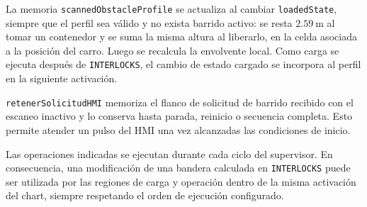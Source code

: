 \documentclass[a4paper,10pt,onecolumn,journal]{ieeeconf}
\numberwithin{equation}{section}
\begin{document}
La memoria \texttt{scannedObstacleProfile} se actualiza al cambiar \texttt{loadedState}, siempre que el perfil sea válido y no exista barrido activo: se resta $2.59~\mathrm{m}$ al tomar un contenedor y se suma la misma altura al liberarlo, en la celda asociada a la posición del carro. Luego se recalcula la envolvente local. Como carga se ejecuta después de \texttt{INTERLOCKS}, el cambio de estado cargado se incorpora al perfil en la siguiente activación.

\texttt{retenerSolicitudHMI} memoriza el flanco de solicitud de barrido recibido con el escaneo inactivo y lo conserva hasta parada, reinicio o secuencia completa. Esto permite atender un pulso del HMI una vez alcanzadas las condiciones de inicio.

Las operaciones indicadas se ejecutan durante cada ciclo del supervisor. En consecuencia, una modificación de una bandera calculada en \texttt{INTERLOCKS} puede ser utilizada por las regiones de carga y operación dentro de la misma activación del chart, siempre respetando el orden de ejecución configurado.

\end{document}

